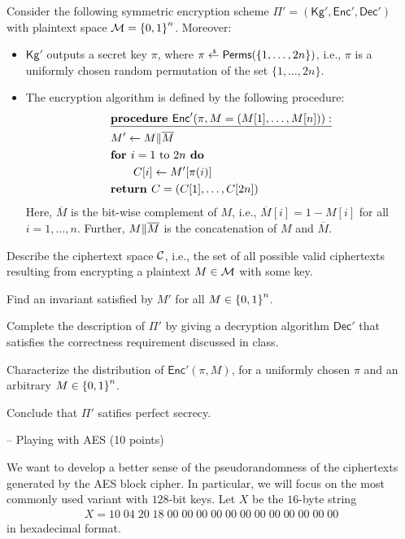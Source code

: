 \documentclass{homework}
\def\Kg{{\mathsf{Kg}}}
\def\Enc{{\mathsf{Enc}}}
\def\Dec{{\mathsf{Dec}}}
\def\Perms{{\mathsf{Perms}}}
\begin{document}
Consider the following symmetric encryption scheme $\Pi' =(\Kg',\Enc',\Dec')$ with plaintext space ${\mathcal{M}} = {\{0,1\}}^n$. Moreover:
\begin{itemize}
\item $\Kg'$ outputs a secret key $\pi$, where
${\pi\draws\Perms(\{1, \ldots, 2n\})}$, i.e.,
$\pi$ is a uniformly chosen random permutation of the set $\{1, \ldots, 2n\}$.
\item 
The encryption algorithm is defined by the following procedure:
\begin{align*}
&\underline{\textbf{procedure }\Enc'(\pi,M=(M[1],\dots,M[n])):}\\
&M' \gets M \concat \overline{M}\\
&\textbf{for }i=1\textup{ to }2n\textbf{ do}\\
&\qquad C[i]\gets M'[\pi(i)]\\
&\textbf{return }C=(C[1],\dots,C[2n])
\end{align*}
Here, $\overline{M}$ is the bit-wise complement of $M$, i.e., $\overline{M}[i] = 1 - M[i]$ for all $i=1, \ldots, n$. Further, $M {\parallel} \overline{M}$ is the concatenation of $M$ and $\overline{M}$.
\end{itemize}
\begin{subtasks}
\item {} Describe the ciphertext space ${\mathcal{C}}$, i.e., the set of all possible valid ciphertexts resulting from encrypting a plaintext $M \in {\mathcal{M}}$ with some key.

 Find an invariant satisfied by $M'$ for all $M \in {\{0,1\}}^{n}$.


\item {} Complete the description of $\Pi'$ by giving a decryption algorithm $\Dec'$
that satisfies the correctness requirement discussed in class.
\item {} Characterize the distribution of $\Enc'(\pi, M)$, for a uniformly chosen $\pi$ and an arbitrary $M \in {\{0,1\}}^n$. 

\item {} Conclude that $\Pi'$ satifies perfect secrecy.
\end{subtasks}





 -- Playing with AES (10 points)

We want to develop a better sense of
the pseudorandomness of the ciphertexts generated by the AES block cipher.
In particular,
we will focus on the most commonly used variant with $128$-bit keys.
Let $X$ be the $16$-byte string
\begin{align*}
X = 10\; 04\; 20\; 18\;
00\; 00\; 00\; 00\; 00\; 00\; 00\; 00\; 00\; 00\; 00\; 00
\end{align*}
in hexadecimal format.
\end{document}
